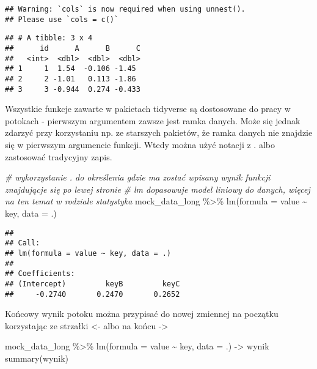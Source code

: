 \documentclass[
]{book}
\newenvironment{Shaded}{\begin{snugshade}}{\end{snugshade}}
\newcommand{\AttributeTok}[1]{\textcolor[rgb]{0.77,0.63,0.00}{#1}}
\newcommand{\CommentTok}[1]{\textcolor[rgb]{0.56,0.35,0.01}{\textit{#1}}}
\newcommand{\FunctionTok}[1]{\textcolor[rgb]{0.00,0.00,0.00}{#1}}
\newcommand{\NormalTok}[1]{#1}
\newcommand{\OtherTok}[1]{\textcolor[rgb]{0.56,0.35,0.01}{#1}}
\newcommand{\SpecialCharTok}[1]{\textcolor[rgb]{0.00,0.00,0.00}{#1}}
\begin{document}
\begin{verbatim}
## Warning: `cols` is now required when using unnest().
## Please use `cols = c()`
\end{verbatim}

\begin{verbatim}
## # A tibble: 3 x 4
##      id      A      B      C
##   <int>  <dbl>  <dbl>  <dbl>
## 1     1  1.54  -0.106 -1.45 
## 2     2 -1.01   0.113 -1.86 
## 3     3 -0.944  0.274 -0.433
\end{verbatim}

Wszystkie funkcje zawarte w pakietach tidyverse są dostosowane do pracy w potokach - pierwszym argumentem zawsze jest ramka danych. Może się jednak zdarzyć przy korzystaniu np. ze starszych pakietów, że ramka danych nie znajdzie się w pierwszym argumencie funkcji. Wtedy można użyć notacji z . albo zastosować tradycyjny zapis.

\begin{Shaded}
\begin{Highlighting}[]
\CommentTok{\# wykorzystanie . do określenia gdzie ma zostać wpisany wynik funkcji znajdującje się po lewej stronie}
\CommentTok{\# lm dopasowuje model liniowy do danych, więcej na ten temat w rodziale statystyka}
\NormalTok{mock\_data\_long }\SpecialCharTok{\%\textgreater{}\%} \FunctionTok{lm}\NormalTok{(}\AttributeTok{formula =}\NormalTok{ value }\SpecialCharTok{\textasciitilde{}}\NormalTok{ key, }\AttributeTok{data =}\NormalTok{ .)}
\end{Highlighting}
\end{Shaded}

\begin{verbatim}
## 
## Call:
## lm(formula = value ~ key, data = .)
## 
## Coefficients:
## (Intercept)         keyB         keyC  
##     -0.2740       0.2470       0.2652
\end{verbatim}

Końcowy wynik potoku można przypisać do nowej zmiennej na początku korzystając ze strzałki \textless- albo na końcu -\textgreater{}

\begin{Shaded}
\begin{Highlighting}[]
\NormalTok{mock\_data\_long }\SpecialCharTok{\%\textgreater{}\%} \FunctionTok{lm}\NormalTok{(}\AttributeTok{formula =}\NormalTok{ value }\SpecialCharTok{\textasciitilde{}}\NormalTok{ key, }\AttributeTok{data =}\NormalTok{ .) }\OtherTok{{-}\textgreater{}}\NormalTok{ wynik}
\FunctionTok{summary}\NormalTok{(wynik)}
\end{Highlighting}
\end{Shaded}
\end{document}
